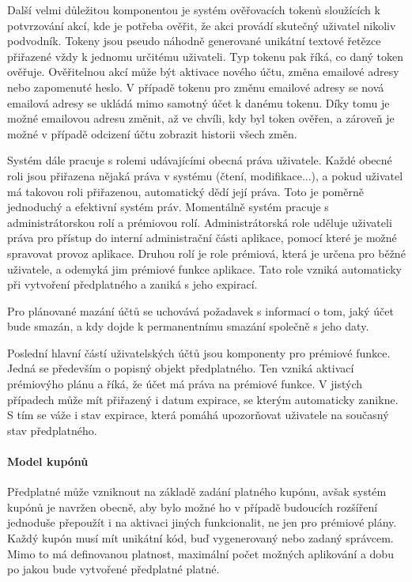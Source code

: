 		Další velmi důležitou komponentou je systém ověřovacích tokenů sloužících k potvrzování akcí, kde
		je potřeba ověřit, že akci provádí skutečný uživatel nikoliv podvodník.
		Tokeny jsou pseudo náhodně generované unikátní textové řetězce přiřazené vždy k jednomu určitému uživateli.
		Typ tokenu pak říká, co daný token ověřuje.
		Ověřitelnou akcí může být aktivace nového účtu, změna emailové adresy nebo zapomenuté heslo.
		V případě tokenu pro změnu emailové adresy se nová emailová adresy se ukládá mimo samotný účet k danému tokenu.
		Díky tomu je možné emailovou adresu změnit, až ve chvíli, kdy byl token ověřen, a zároveň je možné v případě
		odcizení účtu zobrazit historii všech změn.

		Systém dále pracuje s rolemi udávajícími obecná práva uživatele.
		Každé obecné roli jsou přiřazena nějaká práva v systému (čtení, modifikace...), a pokud uživatel má takovou roli
		přiřazenou, automatický dědí její práva.
		Toto je poměrně jednoduchý a efektivní systém práv.
		Momentálně systém pracuje s administrátorskou rolí a prémiovou rolí.
		Administrátorská role uděluje uživateli práva pro přístup do interní administrační části
		aplikace, pomocí které je možné spravovat provoz aplikace.
		Druhou rolí je role prémiová, která je určena pro běžné uživatele, a odemyká jim prémiové funkce aplikace.
		Tato role vzniká automaticky při vytvoření předplatného a zaniká s jeho expirací.

		Pro plánované mazání účtů se uchovává požadavek s informací o tom, jaký účet bude smazán, a kdy dojde k permanentnímu
		smazání společně s jeho daty.

		Poslední hlavní částí uživatelských účtů jsou komponenty pro prémiové funkce.
		Jedná se především o popisný objekt předplatného.
		Ten vzniká aktivací prémiovýho plánu a říká, že účet má práva na prémiové funkce.
		V jistých případech může mít přiřazený i datum expirace, se kterým automaticky zanikne.
		S tím se váže i stav expirace, která pomáhá upozorňovat uživatele na současný stav předplatného.

		\paragraph{Model kupónů}


		Předplatné může vzniknout na základě zadání platného kupónu, avšak systém kupónů je navržen obecně, aby
		bylo možné ho v případě budoucích rozšíření jednoduše přepoužít i na aktivaci jiných funkcionalit, ne jen
		pro prémiové plány.
		Každý kupón musí mít unikátní kód, buď vygenerovaný nebo zadaný správcem.
		Mimo to má definovanou platnost, maximální počet možných aplikování a dobu po jakou bude vytvořené předplatné platné.

